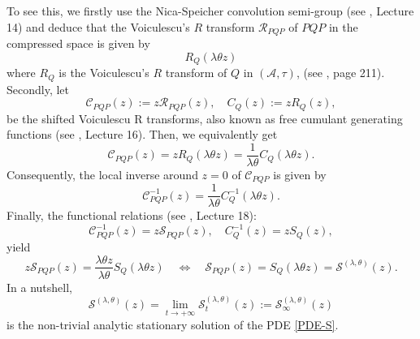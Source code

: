 \documentclass[12pt,reqno]{amsart}
\begin{document}
To see this, we firstly use the Nica-Speicher convolution semi-group (see \cite{MR2266879}, Lecture 14) and deduce that the Voiculescu's $R$ transform $\mathcal{R}_{PQP}$ of $PQP$ in the compressed space is given by 
\begin{equation*}
R_Q(\lambda \theta z)     
\end{equation*}
where $R_Q$ is the Voiculescu's $R$ transform of $Q$ in $(\mathscr{A}, \tau)$, (see \cite{MR2266879}, page 211). Secondly, let 
\begin{equation*}
\mathcal{C}_{PQP}(z) := z \mathcal{R}_{PQP}(z), \quad C_Q(z) := zR_Q(z), 
\end{equation*}
be the shifted Voiculescu R transforms, also known as free cumulant generating functions (see \cite{MR2266879}, Lecture 16). Then, we equivalently get
\begin{equation*}
 \mathcal{C}_{PQP}(z) = zR_Q(\lambda \theta z) = \frac{1}{\lambda \theta}C_Q(\lambda \theta z). 
\end{equation*}
Consequently, the local inverse around $z=0$ of $\mathcal{C}_{PQP}$ is given by 
\begin{equation*}
\mathcal{C}_{PQP}^{-1}(z) = \frac{1}{\lambda \theta}C_Q^{-1}(\lambda \theta z).  
\end{equation*}
Finally, the functional relations (see \cite{MR2266879}, Lecture 18):
$$\mathcal{C}_{PQP}^{-1}(z) = z\mathcal{S}_{PQP}(z), \quad C_Q^{-1}(z) = zS_Q(z),
$$
yield 
\begin{equation*}
 z\mathcal{S}_{PQP}(z) = \frac{\lambda \theta z}{\lambda \theta}S_Q(\lambda \theta z) \quad \Leftrightarrow \quad \mathcal{S}_{PQP}(z) = S_Q(\lambda \theta z) = \mathcal{S}^{(\lambda,\theta)}(z).     
\end{equation*}
In a nutshell, 
\begin{equation*}
 \mathcal{S}^{(\lambda,\theta)}(z) = \lim_{t \rightarrow +\infty} \mathcal{S}_t^{(\lambda,\theta)}(z)   
:= \mathcal{S}_{\infty}^{(\lambda,\theta)}(z)
\end{equation*}
is the non-trivial analytic stationary solution of the PDE \eqref{PDE-S}. 
\end{document}
